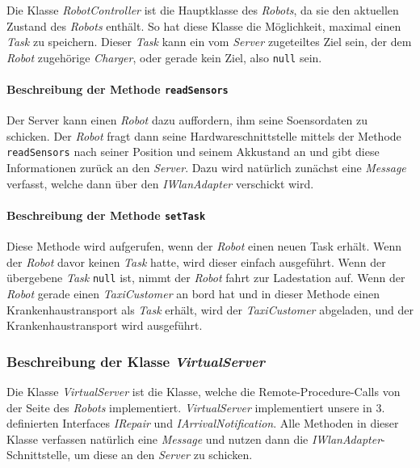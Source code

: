 		Die Klasse \textit{RobotController} ist die Hauptklasse des \textit{Robots}, 
		da sie den aktuellen Zustand des \textit{Robots} enthält.
		So hat diese Klasse die Möglichkeit, maximal einen \textit{Task} zu speichern. 
		Dieser \textit{Task} kann ein vom \textit{Server} zugeteiltes Ziel sein, 
		der dem \textit{Robot} zugehörige \textit{Charger}, oder gerade kein Ziel, 
		also \texttt{null} sein. 

			\paragraph{Beschreibung der Methode \texttt{readSensors}}
			Der Server kann einen \textit{Robot} dazu auffordern, ihm seine Soensordaten zu schicken. 
			Der \textit{Robot} fragt dann seine Hardwareschnittstelle mittels der Methode \texttt{readSensors} 
			nach seiner Position und seinem Akkustand an und gibt diese Informationen zurück an den \textit{Server}. 
			Dazu wird natürlich zunächst eine \textit{Message} verfasst, welche dann über den \textit{IWlanAdapter} verschickt wird.
			
			\paragraph{Beschreibung der Methode \texttt{setTask}}
			Diese Methode wird aufgerufen, wenn der \textit{Robot} einen neuen Task erhält. Wenn der \textit{Robot} davor keinen \textit{Task} hatte, wird dieser einfach ausgeführt. Wenn der übergebene \textit{Task} \texttt{null} ist, nimmt der \textit{Robot} fahrt zur Ladestation auf. Wenn der \textit{Robot} gerade einen \textit{TaxiCustomer} an bord hat und in dieser Methode einen Krankenhaustransport als \textit{Task} erhält, wird der \textit{TaxiCustomer} abgeladen, und der Krankenhaustransport wird ausgeführt.
			
	\subsubsection{Beschreibung der Klasse \textit{VirtualServer}}
	Die Klasse \textit{VirtualServer} ist die Klasse, welche die Remote-Procedure-Calls von der Seite des \textit{Robots} implementiert. \textit{VirtualServer} implementiert unsere in 3. definierten Interfaces \textit{IRepair} und \textit{IArrivalNotification}. Alle Methoden in dieser Klasse verfassen natürlich eine \textit{Message} und nutzen dann die \textit{IWlanAdapter}-Schnittstelle, um diese an den \textit{Server} zu schicken.
	
